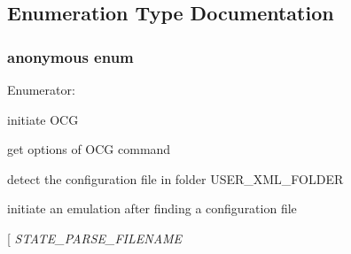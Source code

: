 \subsection{Enumeration Type Documentation}
\subsubsection[{"@0}]{\setlength{\rightskip}{0pt plus 5cm}anonymous enum}\label{group____enum__fsm_g06fc87d81c62e9abb8790b6e5713c55b}


\begin{Desc}
\item[Enumerator: ]\par
\begin{description}
\item[{\em 
STATE\_\-START\_\-OCG\label{group____enum__fsm_gg06fc87d81c62e9abb8790b6e5713c55b087f76f8d785a672ea2824fa74bb9020}
}]initiate OCG \item[{\em 
STATE\_\-GET\_\-OPT\label{group____enum__fsm_gg06fc87d81c62e9abb8790b6e5713c55b5e309103854e3d3a0f10e7e389f33741}
}]get options of OCG command \item[{\em 
STATE\_\-DETECT\_\-FILE\label{group____enum__fsm_gg06fc87d81c62e9abb8790b6e5713c55b94ba814e841264b3169e6fd93d024c73}
}]detect the configuration file in folder USER\_\-XML\_\-FOLDER \item[{\em 
STATE\_\-INI\_\-EMU\label{group____enum__fsm_gg06fc87d81c62e9abb8790b6e5713c55baddb6ea95fb27c17aaa51d48384378d9}
}]initiate an emulation after finding a configuration file \item[{\em 
STATE\_\-PARSE\_\-FILENAME\label{group____enum__fsm_gg06fc87d81c62e9abb8790b6e5713c55b2d1ab40bc9a8d3d4804ef427c11a6fc7}
}
\end{description}
\end{Desc}
